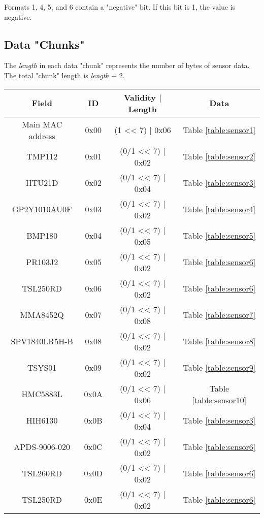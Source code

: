 Formats 1, 4, 5, and 6 contain a "negative" bit.  If this bit is 1, the value is negative.


\subsection{Data "Chunks"}

The \textit{length} in each data "chunk" represents the number of bytes of sensor data.  The total "chunk" length is \textit{length} + 2.

\begin{table}[H]
    \centering
    {
    \begin{tabular}{|c c c c|}
        \hline
        \textbf{Field} & \textbf{ID} & \textbf{Validity | Length} & \textbf{Data}\\
        \hline
        \hline
        Main MAC address & 0x00 & (1 << 7) | 0x06 & Table \ref{table:sensor1}\\
        TMP112 & 0x01 & (0/1 << 7) | 0x02 & Table \ref{table:sensor2}\\
        HTU21D & 0x02 & (0/1 << 7) | 0x04 & Table \ref{table:sensor3}\\
        GP2Y1010AU0F & 0x03 & (0/1 << 7) | 0x02 & Table \ref{table:sensor4}\\
        BMP180 & 0x04 & (0/1 << 7) | 0x05 & Table \ref{table:sensor5}\\
        PR103J2 & 0x05 & (0/1 << 7) | 0x02 & Table \ref{table:sensor6}\\
        TSL250RD & 0x06 & (0/1 << 7) | 0x02 & Table \ref{table:sensor6}\\
        MMA8452Q & 0x07 & (0/1 << 7) | 0x08 & Table \ref{table:sensor7}\\
        SPV1840LR5H-B & 0x08 & (0/1 << 7) | 0x02 & Table \ref{table:sensor8}\\
        TSYS01 & 0x09 & (0/1 << 7) | 0x02 & Table \ref{table:sensor9}\\
        HMC5883L & 0x0A & (0/1 << 7) | 0x06 & Table \ref{table:sensor10}\\
        HIH6130 & 0x0B & (0/1 << 7) | 0x04 & Table \ref{table:sensor3}\\
        APDS-9006-020 & 0x0C & (0/1 << 7) | 0x02 & Table \ref{table:sensor6}\\
        TSL260RD & 0x0D & (0/1 << 7) | 0x02 & Table \ref{table:sensor6}\\
        TSL250RD & 0x0E & (0/1 << 7) | 0x02 & Table \ref{table:sensor6}\\

\end{tabular}}
\end{table}
